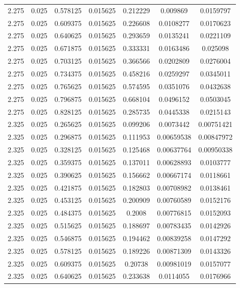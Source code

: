 \begin{table}[bh]
\begin{center}
{\begin{tabular}{ccccccc}
2.275	 & 0.025 & 	0.578125	 & 0.015625	 & 0.212229	 & 0.009869	 & 0.0159797 \\ 
2.275	 & 0.025 & 	0.609375	 & 0.015625	 & 0.226608	 & 0.0108277	 & 0.0170623 \\ 
2.275	 & 0.025 & 	0.640625	 & 0.015625	 & 0.293659	 & 0.0135241	 & 0.0221109 \\ 
2.275	 & 0.025 & 	0.671875	 & 0.015625	 & 0.333331	 & 0.0163486	 & 0.025098 \\ 
2.275	 & 0.025 & 	0.703125	 & 0.015625	 & 0.366566	 & 0.0202809	 & 0.0276004 \\ 
2.275	 & 0.025 & 	0.734375	 & 0.015625	 & 0.458216	 & 0.0259297	 & 0.0345011 \\ 
2.275	 & 0.025 & 	0.765625	 & 0.015625	 & 0.574595	 & 0.0351076	 & 0.0432638 \\ 
2.275	 & 0.025 & 	0.796875	 & 0.015625	 & 0.668104	 & 0.0496152	 & 0.0503045 \\ 
2.275	 & 0.025 & 	0.828125	 & 0.015625	 & 0.285735	 & 0.0445338	 & 0.0215143 \\ 
2.325	 & 0.025 & 	0.265625	 & 0.015625	 & 0.099206	 & 0.0073442	 & 0.00751421 \\ 
2.325	 & 0.025 & 	0.296875	 & 0.015625	 & 0.111953	 & 0.00659538	 & 0.00847972 \\ 
2.325	 & 0.025 & 	0.328125	 & 0.015625	 & 0.125468	 & 0.00637764	 & 0.00950338 \\ 
2.325	 & 0.025 & 	0.359375	 & 0.015625	 & 0.137011	 & 0.00628893	 & 0.0103777 \\ 
2.325	 & 0.025 & 	0.390625	 & 0.015625	 & 0.156662	 & 0.00667174	 & 0.0118661 \\ 
2.325	 & 0.025 & 	0.421875	 & 0.015625	 & 0.182803	 & 0.00708982	 & 0.0138461 \\ 
2.325	 & 0.025 & 	0.453125	 & 0.015625	 & 0.200909	 & 0.00760589	 & 0.0152176 \\ 
2.325	 & 0.025 & 	0.484375	 & 0.015625	 & 0.2008	 & 0.00776815	 & 0.0152093 \\ 
2.325	 & 0.025 & 	0.515625	 & 0.015625	 & 0.188697	 & 0.00783435	 & 0.0142926 \\ 
2.325	 & 0.025 & 	0.546875	 & 0.015625	 & 0.194462	 & 0.00839258	 & 0.0147292 \\ 
2.325	 & 0.025 & 	0.578125	 & 0.015625	 & 0.189226	 & 0.00871309	 & 0.0143326 \\ 
2.325	 & 0.025 & 	0.609375	 & 0.015625	 & 0.20738	 & 0.00981019	 & 0.0157077 \\ 
2.325	 & 0.025 & 	0.640625	 & 0.015625	 & 0.233638	 & 0.0114055	 & 0.0176966 \\ 

\end{tabular}}
\end{center}
\end{table}
